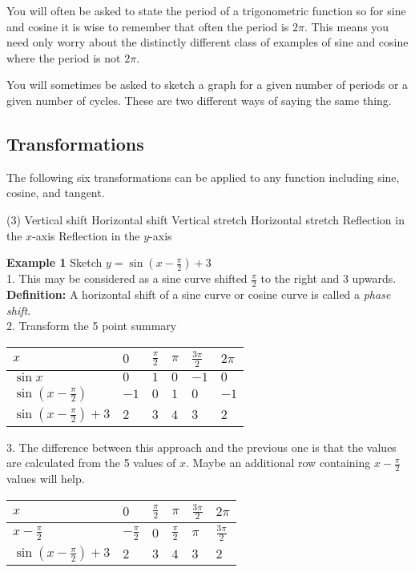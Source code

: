 You will often be asked to state the period of a trigonometric function so for sine and cosine it
is wise to remember that often the period is $2 \pi $. This means you need only worry about the distinctly different class of examples
of sine and cosine where the period is not $2 \pi $. 

You will sometimes be asked to sketch a graph for a given number of periods or a given number of cycles. These are two different ways of saying the same thing. 

\subsection{Transformations}
The following six transformations can be applied to any function including sine, cosine, and tangent. 
\begin{tasks}[style=itemize](3)
\task Vertical shift 
\task Horizontal shift 
\task Vertical stretch 
\task Horizontal stretch 
\task Reflection in the $x$-axis 
\task Reflection in the $y$-axis 
\end{tasks}

\textbf{Example 1}
Sketch $y =\sin  \left (x -\frac{\pi }{2}\right ) +3$ \\
1. This may be considered as a sine curve shifted $\frac{\pi }{2}$ to the right and $3$ upwards.\\ 
\textbf{Definition:} A horizontal shift of a sine curve or cosine curve is called a \emph{phase shift}. \\
2. Transform the 5 point summary \\
\begin{tabular}{llllll}\toprule
	$x$  & $0$  & $\frac{\pi }{2}$  & $\pi $  & $\frac{3 \pi }{2}$  & $2 \pi $  \\
	\midrule
	$\sin  x$  & $0$  & $1$  & $0$  & $ -1$  & $0$  \\
	\midrule
	$\sin  \left (x -\frac{\pi }{2}\right )$  & $ -1$  & $0$  & $1$  & $0$  & $ -1$  \\
	\midrule
	$\sin  \left (x -\frac{\pi }{2}\right ) +3$  & $2$  & $3$  & $4$  & $3$  & $2$  \\
	\bottomrule
\end{tabular}

3. The difference between this approach and the previous one is that the values are calculated
from the 5 values of $x$. Maybe an additional row containing $x -\frac{\pi }{2}$ values will help. \\
\begin{tabular}{llllll}\toprule
	$x$  & $0$  & $\frac{\pi }{2}$  & $\pi $  & $\frac{3 \pi }{2}$  & $2 \pi $  \\
	\midrule
	$x -\frac{\pi }{2}$  & $ -\frac{\pi }{2}$  & $0$  & $\frac{\pi }{2}$  & $\pi $  & $\frac{3 \pi }{2}$  \\
	\midrule
	$\sin  \left (x -\frac{\pi }{2}\right ) +3$  & $2$  & $3$  & $4$  & $3$  & $2$  \\
	\bottomrule
\end{tabular}

